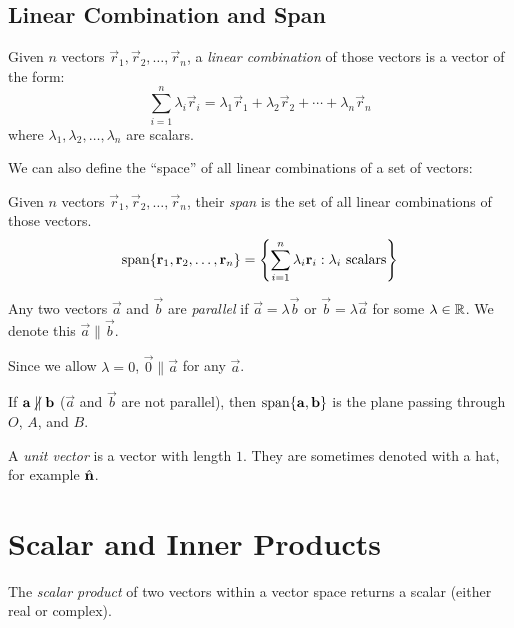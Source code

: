 \documentclass[../main.tex]{subfiles}
\begin{document}
\subsection{Linear Combination and Span}
\begin{definition}
  Given $n$ vectors $\vec{r}_1, \vec{r}_2, \ldots, \vec{r}_n$, a \textit{linear combination} of those vectors is a vector of the form:
  \[
    \sum_{i = 1}^{n} \lambda_i \vec{r}_i  = \lambda_1 \vec{r}_1 + \lambda_2 \vec{r}_2 + \cdots + \lambda_n \vec{r}_n
  \]
  where $\lambda_1, \lambda_2, \ldots, \lambda_n$ are scalars.
\end{definition}
We can also define the ``space'' of all linear combinations of a set of vectors:
\begin{definition}[Span]
  Given $n$ vectors $\vec{r}_1, \vec{r}_2, \ldots, \vec{r}_n$, their \textit{span} is the set of all linear combinations of those vectors.
  \[
    \operatorname{span}\{\mathbf{\bm{r}}_1, \mathbf{\bm{r}}_2, \ldots, \mathbf{\bm{r}}_n\} = \left\{\sum_{i = 1}^{n} \lambda_i \mathbf{\bm{r}}_i : \lambda_i \text{ scalars}\right\}
  \]
\end{definition}
\begin{definition}[Parallel] \label{parallelDef}
  Any two vectors $\vec{a}$ and $\vec{b}$ are \textit{parallel} if $\vec{a} = \lambda \vec{b}$ or $\vec{b} = \lambda \vec{a}$ for some $\lambda \in \mathbb{R}$.
  We denote this $\vec{a} \parallel \vec{b}$.
\end{definition}
\begin{remark}[Note]
  Since we allow $\lambda = 0$, $\vec{0} \parallel \vec{a}$ for any $\vec{a}$.
\end{remark}
If $\vec{a} \centernot\parallel \vec{b}$ ($\vec{a}$ and $\vec{b}$ are not parallel), then $\operatorname{span}\{\mathbf{\bm{a}}, \mathbf{\bm{b}}\}$ is the plane passing through $O$, $A$, and $B$.
\begin{definition}
  A \textit{unit vector} is a vector with length $1$.
  They are sometimes denoted with a hat, for example $\hat{\mathbf{\bm{n}}}$.
\end{definition}
\section{Scalar and Inner Products}
\label{innerProd}
The \textit{scalar product} of two vectors within a vector space returns a scalar (either real or complex).
\end{document}

